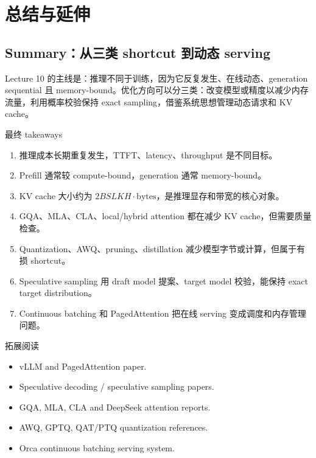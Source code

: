 \section{总结与延伸}

\subsection{Summary：从三类 shortcut 到动态 serving}

Lecture 10 的主线是：推理不同于训练，因为它反复发生、在线动态、generation sequential 且 memory-bound。优化方向可以分三类：改变模型或精度以减少内存流量，利用概率校验保持 exact sampling，借鉴系统思想管理动态请求和 KV cache。

\begin{importantbox}{最终 takeaways}
\begin{enumerate}
    \item 推理成本长期重复发生，TTFT、latency、throughput 是不同目标。
    \item Prefill 通常较 compute-bound，generation 通常 memory-bound。
    \item KV cache 大小约为 \(2BSLKH\cdot\text{bytes}\)，是推理显存和带宽的核心对象。
    \item GQA、MLA、CLA、local/hybrid attention 都在减少 KV cache，但需要质量检查。
    \item Quantization、AWQ、pruning、distillation 减少模型字节或计算，但属于有损 shortcut。
    \item Speculative sampling 用 draft model 提案、target model 校验，能保持 exact target distribution。
    \item Continuous batching 和 PagedAttention 把在线 serving 变成调度和内存管理问题。
\end{enumerate}
\end{importantbox}

\begin{knowledgebox}{拓展阅读}
\begin{itemize}
    \item vLLM and PagedAttention paper.
    \item Speculative decoding / speculative sampling papers.
    \item GQA, MLA, CLA and DeepSeek attention reports.
    \item AWQ, GPTQ, QAT/PTQ quantization references.
    \item Orca continuous batching serving system.
\end{itemize}
\end{knowledgebox}

